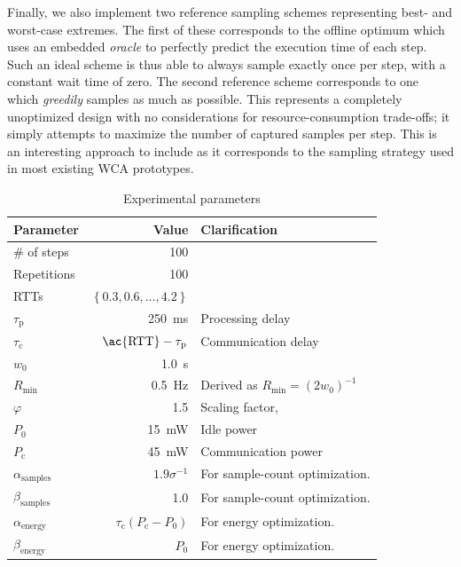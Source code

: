 Finally, we also implement two reference sampling schemes representing best- and worst-case extremes.
The first of these corresponds to the offline optimum which uses an embedded \emph{oracle} to perfectly predict the execution time of each step.
Such an ideal scheme is thus able to always sample exactly once per step, with a constant wait time of zero.
The second reference scheme corresponds to one which \emph{greedily} samples as much as possible.
This represents a completely unoptimized design with no considerations for resource-consumption trade-offs; it simply attempts to maximize the number of captured samples per step.
This is an interesting approach to include as it corresponds to the sampling strategy used in most existing \ac{WCA} prototypes.

\begin{table}
    \centering
    \caption{Experimental parameters}\label{tab:params}
    \begin{tabular}{lrl}
        \toprule
        Parameter & Value & Clarification \\
        \midrule
        \# of steps & \num{100} & \\
        Repetitions & \num{100} & \\
        \acp{RTT} & \( \left\{ 0.3, 0.6,\ldots,4.2 \right\} \) & \\
        \( \tau_\text{p} \) & \SI{250}{\milli\second} & Processing delay \\
        \( \tau_\text{c} \) & \( \text{\ac{RTT}} - \tau_\text{p} \) & Communication delay \\
        \( w_0 \) & \SI{1.0}{\second} & \\
        \( R_\text{min} \) & \SI{0.5}{\hertz} & Derived as \( R_\text{min} = {(2 w_0)}^{-1} \) \\
        \( \varphi \) & \num{1.5} & Scaling factor, \textcite{Wang2019Towards}\\
        \( P_0 \) & \SI{15}{\milli\watt} & Idle power \\
        \( P_\text{c} \) & \SI{45}{\milli\watt} & Communication power \\
        \( \alpha_\text{samples} \) & \( 1.9 \sigma^{-1} \) & For sample-count optimization. \\
        \( \beta_\text{samples} \) & \num{1.0} & For sample-count optimization. \\
        \( \alpha_\text{energy} \) & \( \tau_\text{c}(P_\text{c} - P_0) \) & For energy optimization. \\
        \( \beta_\text{energy} \) & \( P_0 \) & For energy optimization. \\
        \bottomrule
    \end{tabular}
\end{table}

